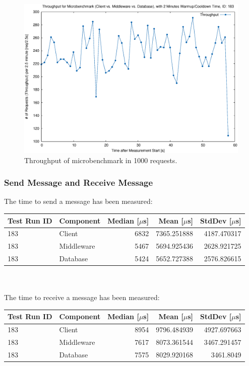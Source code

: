\documentclass[milestone1.tex]{subfiles}
\begin{document}
\begin{figure}[H]
	\begin{center}
    \includegraphics[scale=0.55]{../exported_plots/microbenchmarks/througput.eps}
  \end{center}
  \caption{Throughput of microbenchmark in 1000 requests.}
  \label{fig:mictobenchmarkstp}
\end{figure}


\subsubsection{Send Message and Receive Message}

The time to send a message has been measured:\\

\begin{tabular}{|l|l|r|r|r|}
\hline 
\textbf{Test Run ID} & \textbf{Component} & \textbf{Median [$\mu$s]} & \textbf{Mean [$\mu$s]} & \textbf{StdDev [$\mu$s]} \\ \hline
183 & Client & 6832 & 7365.251888 & 4187.470317 \\ \hline
183 & Middleware & 5467 & 5694.925436 & 2628.921725 \\ \hline
183 & Database & 5424 & 5652.727388 & 2576.826615 \\ \hline
\end{tabular}
\\\\

\noindent The time to receive a message has been measured:\\

\begin{tabular}{|l|l|r|r|r|}
\hline 
\textbf{Test Run ID} & \textbf{Component} & \textbf{Median [$\mu$s]} & \textbf{Mean [$\mu$s]} & \textbf{StdDev [$\mu$s]} \\ \hline
183 & Client & 8954 & 9796.484939 & 4927.697663 \\ \hline
183 & Middleware & 7617 & 8073.361544 & 3467.291457 \\ \hline
183 & Database & 7575 & 8029.920168 & 3461.8049 \\ \hline
\end{tabular}
\\
\end{document}
